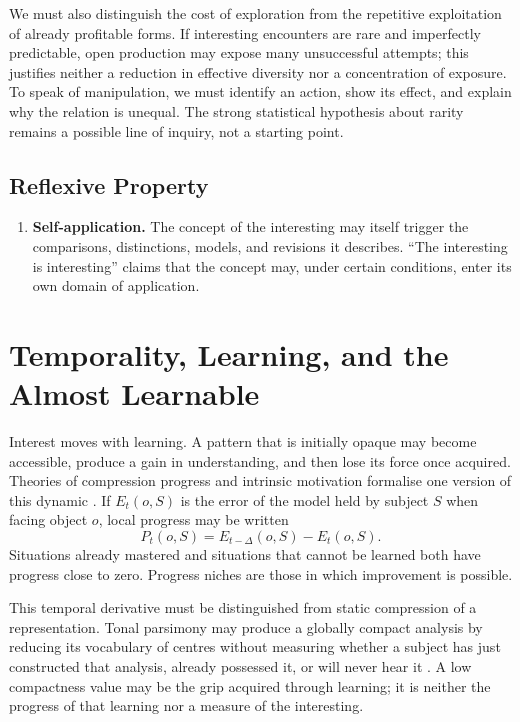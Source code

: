 \documentclass[11pt,a4paper]{article}
\begin{document}
We must also distinguish the cost of exploration from the repetitive
exploitation of already profitable forms. If interesting encounters
are rare and imperfectly predictable, open production may expose many
unsuccessful attempts; this justifies neither a reduction in effective diversity
nor a concentration of exposure. To speak of manipulation, we must identify an
action, show its effect, and explain why the relation is unequal. The strong
statistical hypothesis about rarity remains a possible line of inquiry, not a
starting point.

\subsection{Reflexive Property}

\begin{enumerate}[resume]
  \item \textbf{Self-application.} The concept of the interesting may itself
        trigger the comparisons, distinctions, models, and revisions it
        describes. ``The interesting is interesting'' claims that the concept
        may, under certain conditions, enter its own domain of application.
\end{enumerate}

\section{Temporality, Learning, and the Almost Learnable}

Interest moves with learning. A pattern that is initially opaque may become
accessible, produce a gain in understanding, and then lose its force once
acquired. Theories of compression progress and intrinsic motivation formalise
one version of this dynamic
\parencite{schmidhuber1997interesting,schmidhuber2009compression,oudeyer2007intrinsic,oudeyer2007typology}.
If \(E_t(o,S)\) is the error of the model held by subject \(S\) when facing
object \(o\), local progress may be written
\[
  P_t(o,S)=E_{t-\Delta}(o,S)-E_t(o,S).
\]
Situations already mastered and situations that cannot be learned both have
progress close to zero. Progress niches are those in which improvement is
possible.

This temporal derivative must be distinguished from static compression of a
representation. Tonal parsimony may produce a globally compact analysis by
reducing its vocabulary of centres without measuring whether a subject has just
constructed that analysis, already possessed it, or will never hear it
\parencite{pachet2026tonalparsimony}. A low compactness value may be the grip
acquired through learning; it is neither the progress of that learning nor a
measure of the interesting.
\end{document}
